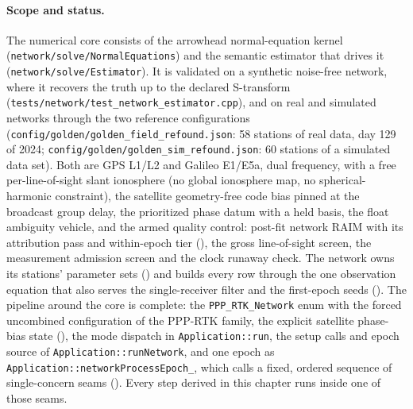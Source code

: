 \documentclass[main.tex]{subfiles}
\begin{document}
\paragraph{Scope and status.}
The numerical core consists of the arrowhead normal-equation kernel
(\texttt{network/solve/NormalEquations}) and the semantic estimator
that drives it (\texttt{network/solve/Estimator}). It is validated on a
synthetic noise-free network, where it recovers the truth up to the
declared S-transform (\texttt{tests/network/test\_network\_estimator.cpp}),
and on real and simulated networks through the two reference
configurations (\texttt{config/golden/golden\_field\_refound.json}: 58
stations of real data, day 129 of 2024;
\texttt{config/golden/golden\_sim\_refound.json}: 60 stations of a
simulated data set). Both are GPS L1/L2 and Galileo E1/E5a, dual
frequency, with a free per-line-of-sight slant ionosphere (no global
ionosphere map, no spherical-harmonic constraint), the satellite
geometry-free code bias pinned at the broadcast group delay, the
prioritized phase datum with a held basis, the float ambiguity vehicle,
and the armed quality control: post-fit network RAIM with its
attribution pass and within-epoch tier
(), the gross
line-of-sight screen, the measurement admission screen and the clock
runaway check. The network owns its stations' parameter sets
() and builds every row through the one observation
equation that also serves the single-receiver filter and the first-epoch
seeds (). The pipeline
around the core is complete: the \texttt{PPP\_RTK\_Network} enum with
the forced uncombined configuration of the PPP-RTK family, the explicit
satellite phase-bias state (), the mode
dispatch in \texttt{Application::run}, the setup calls and epoch source
of \texttt{Application::runNetwork}, and one epoch as
\texttt{Application::networkProcessEpoch\_}, which calls a fixed,
ordered sequence of single-concern seams (). Every
step derived in this chapter runs inside one of those seams.
\end{document}
